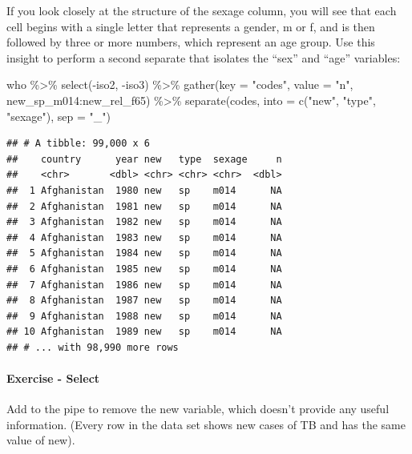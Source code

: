 \documentclass[
]{article}
\newenvironment{Shaded}{\begin{snugshade}}{\end{snugshade}}
\newcommand{\AttributeTok}[1]{\textcolor[rgb]{0.77,0.63,0.00}{#1}}
\newcommand{\FunctionTok}[1]{\textcolor[rgb]{0.00,0.00,0.00}{#1}}
\newcommand{\NormalTok}[1]{#1}
\newcommand{\SpecialCharTok}[1]{\textcolor[rgb]{0.00,0.00,0.00}{#1}}
\newcommand{\StringTok}[1]{\textcolor[rgb]{0.31,0.60,0.02}{#1}}
\begin{document}
If you look closely at the structure of the sexage column, you will see
that each cell begins with a single letter that represents a gender, m
or f, and is then followed by three or more numbers, which represent an
age group. Use this insight to perform a second separate that isolates
the ``sex'' and ``age'' variables:

\begin{Shaded}
\begin{Highlighting}[]
\NormalTok{who }\SpecialCharTok{\%\textgreater{}\%}
  \FunctionTok{select}\NormalTok{(}\SpecialCharTok{{-}}\NormalTok{iso2, }\SpecialCharTok{{-}}\NormalTok{iso3) }\SpecialCharTok{\%\textgreater{}\%} 
  \FunctionTok{gather}\NormalTok{(}\AttributeTok{key =} \StringTok{"codes"}\NormalTok{, }\AttributeTok{value =} \StringTok{"n"}\NormalTok{, new\_sp\_m014}\SpecialCharTok{:}\NormalTok{new\_rel\_f65) }\SpecialCharTok{\%\textgreater{}\%} 
  \FunctionTok{separate}\NormalTok{(codes, }\AttributeTok{into =} \FunctionTok{c}\NormalTok{(}\StringTok{"new"}\NormalTok{, }\StringTok{"type"}\NormalTok{, }\StringTok{"sexage"}\NormalTok{), }\AttributeTok{sep =} \StringTok{"\_"}\NormalTok{)}
\end{Highlighting}
\end{Shaded}

\begin{verbatim}
## # A tibble: 99,000 x 6
##    country      year new   type  sexage     n
##    <chr>       <dbl> <chr> <chr> <chr>  <dbl>
##  1 Afghanistan  1980 new   sp    m014      NA
##  2 Afghanistan  1981 new   sp    m014      NA
##  3 Afghanistan  1982 new   sp    m014      NA
##  4 Afghanistan  1983 new   sp    m014      NA
##  5 Afghanistan  1984 new   sp    m014      NA
##  6 Afghanistan  1985 new   sp    m014      NA
##  7 Afghanistan  1986 new   sp    m014      NA
##  8 Afghanistan  1987 new   sp    m014      NA
##  9 Afghanistan  1988 new   sp    m014      NA
## 10 Afghanistan  1989 new   sp    m014      NA
## # ... with 98,990 more rows
\end{verbatim}

\hypertarget{exercise---select-1}{%
\paragraph{Exercise - Select}\label{exercise---select-1}}

Add to the pipe to remove the new variable, which doesn't provide any
useful information. (Every row in the data set shows new cases of TB and
has the same value of new).
\end{document}
